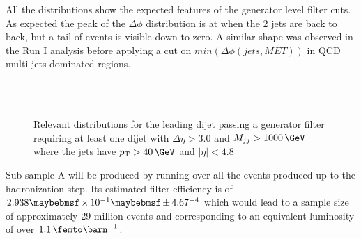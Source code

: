 All the distributions show the expected features of the generator level filter cuts. As expected the peak of the $\Delta\phi$ distribution is at \pi when the 2 jets are back to back, but a tail of events is visible down to zero. A similar shape was observed in the Run I analysis before applying a cut on $min(\Delta\phi(jets,MET))$ in \gls{QCD} multi-jets dominated regions.

\begin{figure}[!htp]%
\centering
{}\qquad
{}\\
\\
\caption{Relevant distributions for the leading dijet passing a generator filter requiring at least one dijet with $\Delta\eta>3.0$ and $M_{jj}>1000\,\GeV$ where the jets have $\pt>40\,\GeV$ and $|\eta|<4.8$}
\label{FIGURE:RunIIPreparation_PassGeneratorFilterDistributions2}
\end{figure}

Sub-sample A will be produced by running over all the events produced up to the hadronization step. Its estimated filter efficiency is of $2.938 \times 10^{-1} \pm 4.67 \time 10^{-4}$ which would lead to a sample size of approximately 29 million events and corresponding to an equivalent luminosity of over $1.1\,\femto\barn^{-1}$.

